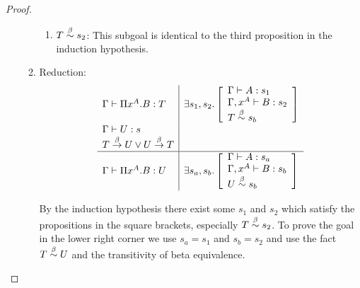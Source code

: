 \begin{theorem}
\begin{proof}
\begin{enumerate}
\begin{enumerate}
\begin{enumerate}
                \item $T \stackrel{\beta}{\sim} s_2$: This subgoal is identical to the third
                        proposition in the induction hypothesis.
                \end{enumerate}

            \item Reduction:
                $$
                \begin{array}{l|l}
                    \Gamma \vdash \Pi x^A. B : T
                    &
                    \exists s_1, s_2.
                    \left[
                    \begin{array}{l}
                        \Gamma \vdash A : s_1
                        \\
                        \Gamma, x^A \vdash B : s_2
                        \\
                        T \stackrel{\beta}{\sim} s_b
                    \end{array}
                    \right]
                    \\
                    \Gamma \vdash U : s
                    \\
                    T \stackrel{\beta}{\to} U \lor U \stackrel{\beta}{\to} T
                    \\
                    \hline
                    \Gamma \vdash \Pi x^A. B : U
                    &
                    \exists s_a, s_b.
                    \left[
                    \begin{array}{l}
                        \Gamma \vdash A : s_a
                        \\
                        \Gamma, x^A \vdash B : s_b
                        \\
                        U \stackrel{\beta}{\sim} s_b
                    \end{array}
                    \right]
                \end{array}
                $$

                By the induction hypothesis there exist some $s_1$ and $s_2$
                which satisfy the propositions in the square brackets,
                especially $T \stackrel{\beta}{\sim} s_2$. To prove the goal in the lower right
                corner we use $s_a = s_1$ and $s_b = s_2$ and use the fact $T
                \stackrel{\beta}{\sim} U$ and the transitivity of beta equivalence.

            \end{enumerate}
        \end{enumerate}
    \end{proof}
\end{theorem}



